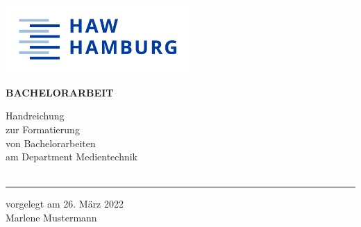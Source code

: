 \begin{titlepage}
  \color{haw}
  \raggedright{}
  \hfill\includegraphics[width=7cm]{HAW_Marke_RGB_300dpi}\\

  \vspace{5cm}

  \setmainfont{Open Sans}
  \small
  \textbf{BACHELORARBEIT}

  \vspace{8mm}

  \begin{minipage}{0.8\linewidth}
    \setmainfont{Martel Heavy}
    \LARGE
    Handreichung\\[1mm]
    zur Formatierung\\[1mm]
    von Bachelorarbeiten\\[1mm]
    am Department Medientechnik\\
    \,\rule{11mm}{1.2mm}
  \end{minipage}

  \vspace{1cm}

  vorgelegt am 26. März 2022\\
  Marlene Mustermann


\end{titlepage}
